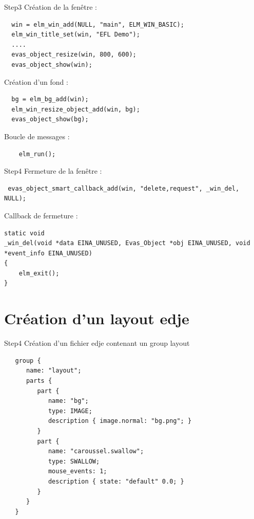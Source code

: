 \documentclass{beamer}
\newcounter{image}
\begin{document}
\begin{frame}[fragile]{Step3}
Création de la fenêtre :
\begin{lstlisting}
  win = elm_win_add(NULL, "main", ELM_WIN_BASIC);
  elm_win_title_set(win, "EFL Demo");
  ....
  evas_object_resize(win, 800, 600);
  evas_object_show(win);
\end{lstlisting}

Création d'un fond :
\begin{lstlisting}
  bg = elm_bg_add(win);
  elm_win_resize_object_add(win, bg);
  evas_object_show(bg);
\end{lstlisting}


Boucle de messages :
\begin{lstlisting}
    elm_run();
\end{lstlisting}
\end{frame}

\begin{frame}[fragile]{Step4}
Fermeture de la fenêtre :
\begin{lstlisting}
 evas_object_smart_callback_add(win, "delete,request", _win_del, NULL);
\end{lstlisting}

Callback de fermeture :
\begin{lstlisting}
static void
_win_del(void *data EINA_UNUSED, Evas_Object *obj EINA_UNUSED, void *event_info EINA_UNUSED)
{
    elm_exit();
}
\end{lstlisting}
\end{frame}

\section{Création d'un layout edje}
\begin{frame}[fragile]{Step4}
Création d'un fichier edje contenant un group layout
\begin{lstlisting}
   group {
      name: "layout";
      parts {
         part {
            name: "bg";
            type: IMAGE;
            description { image.normal: "bg.png"; }
         }
         part {
            name: "caroussel.swallow";
            type: SWALLOW;
            mouse_events: 1;
            description { state: "default" 0.0; }
         }
      }
   }
\end{lstlisting}
\end{frame}
\end{document}
